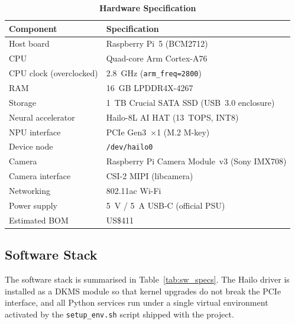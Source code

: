 \documentclass{ieeeaccess}
\begin{document}
\begin{table}[ht!]
\caption{\textbf{Hardware Specification}}
\label{tab:hw_specs}
\setlength{\tabcolsep}{3pt}
\centering\footnotesize
\begin{tabular}{|l|p{4.0cm}|}
\hline
\textbf{Component} & \textbf{Specification} \\
\hline
Host board & Raspberry Pi~5 (BCM2712) \\
CPU & Quad-core Arm Cortex-A76 \\
CPU clock (overclocked) & 2.8~GHz (\texttt{arm\_freq=2800}) \\
RAM & 16~GB LPDDR4X-4267 \\
Storage & 1~TB Crucial SATA SSD (USB~3.0 enclosure) \\
Neural accelerator & Hailo-8L AI HAT (13~TOPS, INT8) \\
NPU interface & PCIe Gen3~$\times$1 (M.2 M-key) \\
Device node & \texttt{/dev/hailo0} \\
Camera & Raspberry Pi Camera Module~v3 (Sony IMX708) \\
Camera interface & CSI-2 MIPI (libcamera) \\
Networking & 802.11ac Wi-Fi \\
Power supply & 5~V / 5~A USB-C (official PSU) \\
Estimated BOM & US\$411 \\
\hline
\end{tabular}
\end{table}

\subsection{Software Stack}
The software stack is summarised in Table~\ref{tab:sw_specs}. The Hailo driver is installed as a DKMS module so that kernel upgrades do not break the PCIe interface, and all Python services run under a single virtual environment activated by the \texttt{setup\_env.sh} script shipped with the project.
\end{document}
